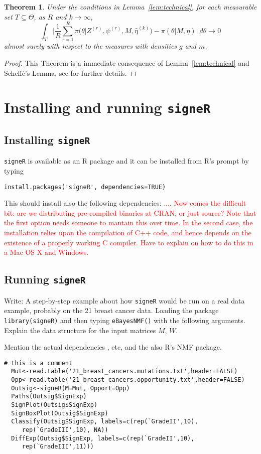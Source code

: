 \documentclass[11pt]{amsart}
\newtheorem{theorem}{Theorem}
\theoremstyle{definition}
\theoremstyle{remark}
\begin{document}
\begin{theorem} Under the conditions in Lemma~\ref{lem:technical}, for
  each measurable set $T\subseteq\Theta$, as $R$ and $k \to \infty$,
\[
  \int_T \bigg|
       \frac{1}{R}\sum_{r=1}^R \pi\big(\theta|Z^{(r)}, \psi^{(r)},
       M, \hat\eta^{(k)}\big) - \pi(\theta|M, \eta)
    \bigg|\ d\theta \to 0
\]
almost surely with respect to the measures with densities $g$  and
$m$.
\end{theorem}
\begin{proof}
This Theorem is a immediate consequence of Lemma~\ref{lem:technical}
and Scheff\'e's Lemma, see \cite{C01} for further details.
\end{proof}


\section{Installing and running \texttt{signeR}}
\subsection{Installing \texttt{signeR}}
\texttt{signeR} is available as an R package and it can be installed
from R's prompt by typing
\begin{lstlisting}[]
  install.packages('signeR', dependencies=TRUE)
\end{lstlisting}
This should install also the following dependencies:
\textcolor{red}{....  Now comes the difficult bit: are we distributing
pre-compiled binaries at CRAN, or just source? Note that the first
option needs someone to mantain this over time. In the second case,
the installation relies upon the compilation of C++ code, and hence
depends on the existence of a properly working C compiler. Have to
explain on how to do this in a Mac OS X and Windows.}


\subsection{Running \texttt{signeR}}
Write: A step-by-step example about how \texttt{signeR} would be run
on a real data example, probably on the 21 breast cancer data.
Loading the package \verb+library(signeR)+ and then typing
\verb+eBayesNMF()+ with the following arguments. Explain the data
structure for the input matrices $M$, $W$.


Mention the actual dependencies \cite{Boo}, etc, and the also
R's NMF package.
\begin{lstlisting}[]
  # this is a comment
  Mut<-read.table('21_breast_cancers.mutations.txt',header=FALSE)
  Opp<-read.table('21_breast_cancers.opportunity.txt',header=FALSE)
  Outsig<-signeR(M=Mut, Opport=Opp)  
  Paths(Outsig$SignExp)
  SignPlot(Outsig$SignExp)
  SignBoxPlot(Outsig$SignExp)
  Classify(Outsig$SignExp, labels=c(rep(`GradeII',10),
     rep(`GradeIII',10), NA))
  DiffExp(Outsig$SignExp, labels=c(rep(`GradeII',10),
     rep(`GradeIII',11)))
\end{lstlisting}
\end{document}
